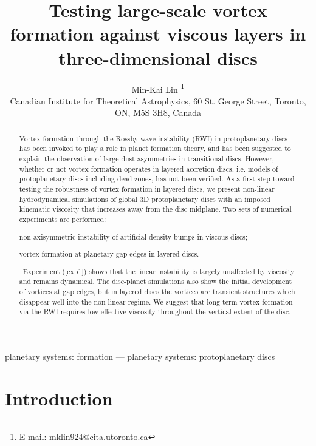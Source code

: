 \documentclass[useAMS,usenatbib]{mn2e}
\title[Vortices in viscous discs]{Testing large-scale 
  vortex formation against viscous layers in three-dimensional discs}
\author[Lin]{Min-Kai Lin%
  \thanks{E-mail: mklin924@cita.utoronto.ca} \\%
Canadian Institute for Theoretical Astrophysics,
  60 St. George Street, Toronto, ON, M5S 3H8, Canada %
}
\begin{document}
\maketitle
\begin{abstract}
  Vortex formation through the Rossby wave 
  instability (RWI) in protoplanetary discs has been invoked to play a
  role in planet formation theory, and has been suggested to explain
  the observation of large dust asymmetries in transitional discs.   
  However, whether or not vortex formation operates in layered
  accretion discs, i.e. models of protoplanetary discs including dead zones, 
  has not been verified. As a first step toward testing the robustness of
  vortex formation in layered discs, we present 
  non-linear hydrodynamical 
  simulations of global 3D protoplanetary discs with an imposed kinematic
  viscosity that increases away from the disc midplane. Two sets of numerical 
  experiments are performed:
  \begin{inparaenum}[(i)]
  \item non-axisymmetric instability of artificial
    density bumps in viscous discs;\label{exp1}  
  \item vortex-formation at planetary gap edges in layered discs.%
  \end{inparaenum}\,
   Experiment (\ref{exp1}) shows that the linear instability is
   largely unaffected by viscosity and remains dynamical.   
   The disc-planet simulations  
   also show the initial development of vortices at gap edges, but in
   layered discs the vortices are transient structures which disappear  
   well into the non-linear regime. We suggest that long term vortex
   formation via the RWI requires low effective viscosity throughout the 
   vertical extent of the disc. 
\end{abstract}

\begin{keywords}
planetary systems: formation --- planetary systems:
protoplanetary discs
\end{keywords}


\section{Introduction}\label{intro}
\end{document}
